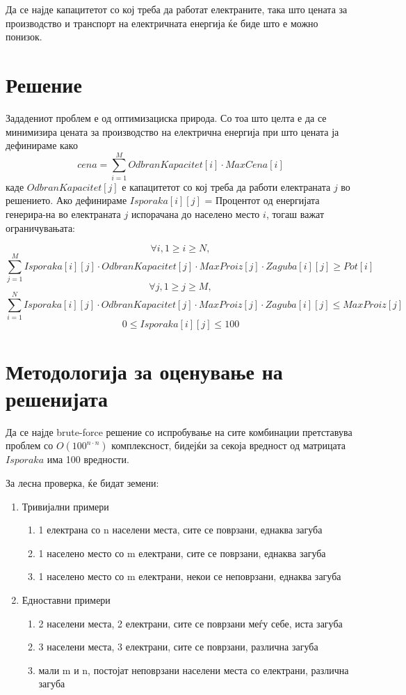 \documentclass{article}
\begin{document}
Да се најде капацитетот со кој треба да работат електраните, така што цената за производство и транспорт на електричната енергија ќе биде што е можно понизок.

\section{Решение}

Зададениот проблем е од оптимизациска природа. Со тоа што целта е да се минимизира цената за производство на електрична енергија при што цената ја дефинираме како
\[cena = \sum_{i=1}^{M}OdbranKapacitet[i]\cdot MaxCena[i]\]
каде $OdbranKapacitet[j]$ е капацитетот со кој треба да работи електраната $j$ во решението. Ако дефинираме $Isporaka[i][j]$ = Процентот од енергијата генерира-на во електраната $j$ испорачана до населено место $i$, тогаш важат ограничувањата:

\[\forall i, 1 \geq i \geq N,\]
\[\sum_{j=1}^{M} Isporaka[i][j] \cdot OdbranKapacitet[j] \cdot MaxProiz[j] \cdot Zaguba[i][j] \geq Pot[i]\]
\[\forall j, 1\geq j \geq M,\]
\[\sum_{i=1}^{N} Isporaka[i][j] \cdot OdbranKapacitet[j] \cdot MaxProiz[j] \cdot Zaguba[i][j] \leq MaxProiz[j] \]
\[ 0 \leq Isporaka[i][j] \leq 100 \]

\section{Методологија за оценување на решенијата}
Да се најде brute-force решение со испробување на сите комбинации претставува проблем со $O(100^{n \cdot n})$  комплексност, бидејќи за секоја вредност од матрицата $Isporaka$ има 100 вредности. 

За лесна проверка, ќе бидат земени:
\begin{enumerate}
\item Тривијални примери
	\begin{enumerate}
	\item 1 електрана со n населени места, сите се поврзани, еднаква загуба
	\item 1 населено место со m електрани, сите се поврзани, еднаква загуба
	\item 1 населено место со m електрани, некои се неповрзани, еднаква загуба
	\end{enumerate} 
\item Едноставни примери
	\begin{enumerate}
	\item 2 населени места, 2 електрани, сите се поврзани меѓу себе, иста загуба
	\item 3 населени места, 3 електрани, сите се поврзани, различна загуба
	\item мали m и n, постојат неповрзани населени места со електрани, различна загуба
	\end{enumerate}
\end{enumerate}
\end{document}
